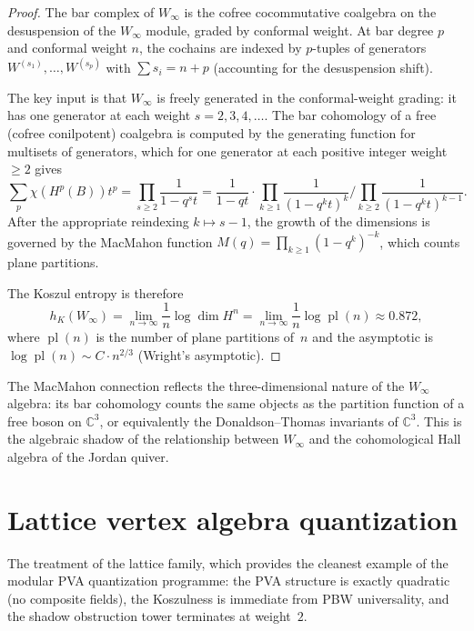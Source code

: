 \begin{proof}
The bar complex of $W_\infty$ is the cofree cocommutative coalgebra
on the desuspension of the $W_\infty$ module, graded by conformal weight.
At bar degree $p$ and conformal weight $n$, the cochains are indexed by
$p$-tuples of generators $W^{(s_1)}, \dots, W^{(s_p)}$ with
$\sum s_i = n + p$ (accounting for the desuspension shift).

The key input is that $W_\infty$ is freely generated in the
conformal-weight grading: it has one generator at each weight
$s = 2, 3, 4, \dots$. The bar cohomology of a free
(cofree conilpotent) coalgebra is computed by the generating function
for multisets of generators, which for one generator at each positive
integer weight $\ge 2$ gives
\[
\sum_p \chi(H^p(B)) t^p
=
\prod_{s \ge 2} \frac{1}{1 - q^s t}
=
\frac{1}{1-qt} \cdot \prod_{k \ge 1} \frac{1}{(1-q^k t)^k}
\bigg/ \prod_{k \ge 2} \frac{1}{(1-q^k t)^{k-1}}.
\]
After the appropriate reindexing $k \mapsto s-1$, the growth of
the dimensions is governed by the MacMahon function
$M(q) = \prod_{k \ge 1}(1-q^k)^{-k}$, which counts plane partitions.

The Koszul entropy is therefore
\[
h_K(W_\infty)
=
\lim_{n \to \infty} \frac{1}{n}\log\dim H^n
=
\lim_{n \to \infty} \frac{1}{n}\log\operatorname{pl}(n)
\approx 0.872,
\]
where $\operatorname{pl}(n)$ is the number of plane partitions of~$n$
and the asymptotic is $\log\operatorname{pl}(n) \sim C \cdot n^{2/3}$
(Wright's asymptotic).
\end{proof}

\begin{remark}
The MacMahon connection reflects the three-dimensional nature of the
$W_\infty$ algebra: its bar cohomology counts the same objects as the
partition function of a free boson on $\mathbb{C}^3$, or equivalently
the Donaldson--Thomas invariants of $\mathbb{C}^3$. This is the
algebraic shadow of the relationship between $W_\infty$ and the
cohomological Hall algebra of the Jordan quiver.
\end{remark}


\section{Lattice vertex algebra quantization}

The treatment of the lattice family, which provides the cleanest example of
the modular PVA quantization programme: the PVA structure is exactly
quadratic (no composite fields), the Koszulness is immediate from PBW
universality, and the shadow obstruction tower terminates at weight~$2$.

